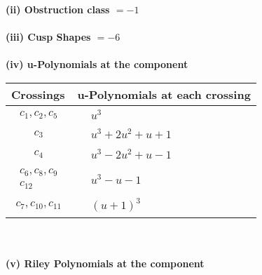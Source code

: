 \documentclass[1p]{elsarticle_modified}
\theoremstyle{definition}
\begin{document}
\flushleft \textbf{(ii) Obstruction class $= -1$}\\~\\
\flushleft \textbf{(iii) Cusp Shapes $= -6$}\\~\\
\newpage\renewcommand{\arraystretch}{1}
\flushleft \textbf{(iv) u-Polynomials at the component}\newline \\
\begin{tabular}{m{50pt}|m{274pt}}
Crossings & \hspace{64pt}u-Polynomials at each crossing \\
\hline $$\begin{aligned}c_{1},c_{2},c_{5}\end{aligned}$$&$\begin{aligned}
&u^3
\end{aligned}$\\
\hline $$\begin{aligned}c_{3}\end{aligned}$$&$\begin{aligned}
&u^3+2 u^2+u+1
\end{aligned}$\\
\hline $$\begin{aligned}c_{4}\end{aligned}$$&$\begin{aligned}
&u^3-2 u^2+u-1
\end{aligned}$\\
\hline $$\begin{aligned}c_{6},c_{8},c_{9}\\c_{12}\end{aligned}$$&$\begin{aligned}
&u^3- u-1
\end{aligned}$\\
\hline $$\begin{aligned}c_{7},c_{10},c_{11}\end{aligned}$$&$\begin{aligned}
&(u+1)^3
\end{aligned}$\\
\hline
\end{tabular}\\~\\
\newpage\renewcommand{\arraystretch}{1}
\flushleft \textbf{(v) Riley Polynomials at the component}\newline \\
\end{document}
